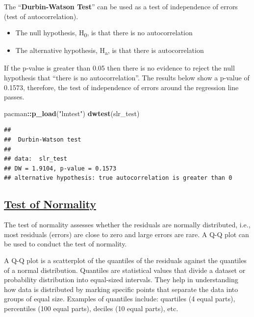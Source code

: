\documentclass[
]{article}
\newenvironment{Shaded}{\begin{snugshade}}{\end{snugshade}}
\newcommand{\FunctionTok}[1]{\textcolor[rgb]{0.13,0.29,0.53}{\textbf{#1}}}
\newcommand{\NormalTok}[1]{#1}
\newcommand{\SpecialCharTok}[1]{\textcolor[rgb]{0.81,0.36,0.00}{\textbf{#1}}}
\newcommand{\StringTok}[1]{\textcolor[rgb]{0.31,0.60,0.02}{#1}}
\begin{document}
The ``\textbf{Durbin-Watson Test}'' can be used as a test of
independence of errors (test of autocorrelation).

\begin{itemize}
\item
  The null hypothesis, H\textsubscript{0}, is that there is no
  autocorrelation
\item
  The alternative hypothesis, H\textsubscript{a}, is that there is
  autocorrelation
\end{itemize}

If the p-value is greater than 0.05 then there is no evidence to reject
the null hypothesis that ``there is no autocorrelation''. The results
below show a p-value of 0.1573, therefore, the test of independence of
errors around the regression line passes.

\begin{Shaded}
\begin{Highlighting}[]
\NormalTok{pacman}\SpecialCharTok{::}\FunctionTok{p\_load}\NormalTok{(}\StringTok{"lmtest"}\NormalTok{)}
\FunctionTok{dwtest}\NormalTok{(slr\_test)}
\end{Highlighting}
\end{Shaded}

\begin{verbatim}
## 
##  Durbin-Watson test
## 
## data:  slr_test
## DW = 1.9104, p-value = 0.1573
## alternative hypothesis: true autocorrelation is greater than 0
\end{verbatim}

\subsection{\texorpdfstring{\ul{\textbf{Test of
Normality}}}{Test of Normality}}\label{test-of-normality}

The test of normality assesses whether the residuals are normally
distributed, i.e., most residuals (errors) are close to zero and large
errors are rare. A Q-Q plot can be used to conduct the test of
normality.

A Q-Q plot is a scatterplot of the quantiles of the residuals against
the quantiles of a normal distribution. Quantiles are statistical values
that divide a dataset or probability distribution into equal-sized
intervals. They help in understanding how data is distributed by marking
specific points that separate the data into groups of equal size.
Examples of quantiles include: quartiles (4 equal parts), percentiles
(100 equal parts), deciles (10 equal parts), etc.
\end{document}

